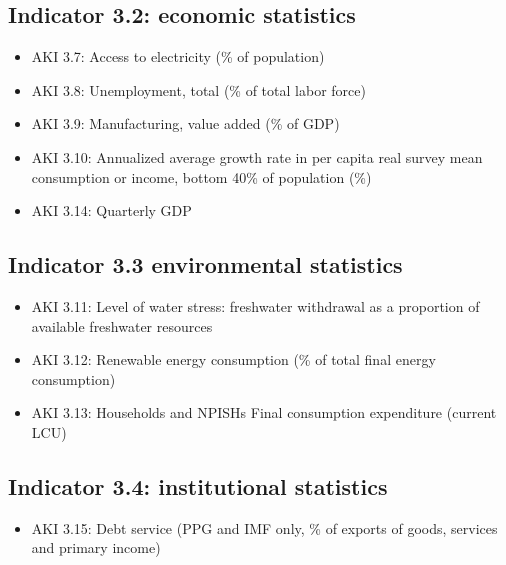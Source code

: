 \documentclass[]{article}
\providecommand{\tightlist}{%
  \setlength{\itemsep}{0pt}\setlength{\parskip}{0pt}}
\begin{document}
\hypertarget{indicator-3.2-economic-statistics}{%
\subsection{Indicator 3.2: economic
statistics}\label{indicator-3.2-economic-statistics}}

\begin{itemize}
\tightlist
\item
  AKI 3.7: Access to electricity (\% of population)\\
\item
  AKI 3.8: Unemployment, total (\% of total labor force)\\
\item
  AKI 3.9: Manufacturing, value added (\% of GDP)\\
\item
  AKI 3.10: Annualized average growth rate in per capita real survey
  mean consumption or income, bottom 40\% of population (\%)\\
\item
  AKI 3.14: Quarterly GDP
\end{itemize}

\hypertarget{indicator-3.3-environmental-statistics}{%
\subsection{Indicator 3.3 environmental
statistics}\label{indicator-3.3-environmental-statistics}}

\begin{itemize}
\tightlist
\item
  AKI 3.11: Level of water stress: freshwater withdrawal as a proportion
  of available freshwater resources\\
\item
  AKI 3.12: Renewable energy consumption (\% of total final energy
  consumption)\\
\item
  AKI 3.13: Households and NPISHs Final consumption expenditure (current
  LCU)
\end{itemize}

\hypertarget{indicator-3.4-institutional-statistics}{%
\subsection{Indicator 3.4: institutional
statistics}\label{indicator-3.4-institutional-statistics}}

\begin{itemize}
\tightlist
\item
  AKI 3.15: Debt service (PPG and IMF only, \% of exports of goods,
  services and primary income)
\end{itemize}
\end{document}
